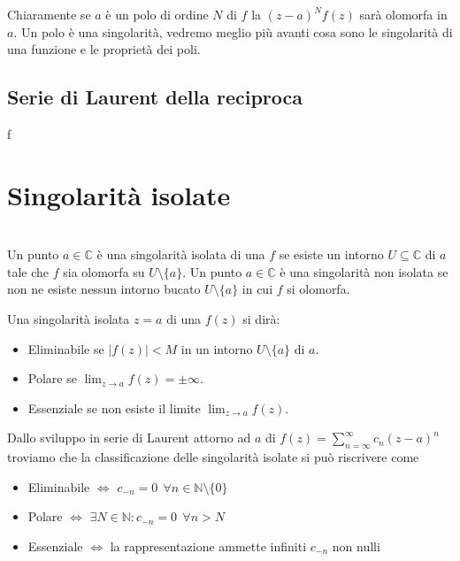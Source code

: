 \documentclass[11pt,a4paper,twoside]{book}
\newenvironment{definizione}[1][\empty]{\begin{Definizione}{
\ifx\empty#1\relax\else\mdseries\itshape#1\\\fi
}{}}{\end{Definizione}}
\theoremstyle{esss}
\theoremstyle{dotless}
\numberwithin{equation}{section} %
\begin{document}
Chiaramente se $a$ è un polo di ordine $N$ di $f$ la $(z-a)^N f(z)$ sarà olomorfa in $a$.
Un polo è una singolarità, vedremo meglio più avanti cosa sono le singolarità di una funzione e le proprietà dei poli.

\subsection{Serie di Laurent della reciproca}
f

\section{Singolarità isolate}

\begin{definizione}Un punto $a\in\mathbb{C}$ è una singolarità isolata di una $f$ se esiste un intorno $U\subseteq\mathbb{C}$ di $a$ tale che $f$ sia olomorfa su $U\setminus\{a\}$. Un punto $a\in\mathbb{C}$ è una singolarità non isolata se non ne esiste nessun intorno bucato $U\setminus\{a\}$ in cui $f$ si olomorfa.
\end{definizione}

Una singolarità isolata $z=a$ di una $f(z)$ si dirà:\begin{itemize}[label=$\cdot$]
\item Eliminabile se $|f(z)|<M$ in un intorno $U\setminus\{a\}$ di $a$. 
\item Polare se $\lim_{z\rightarrow a}f(z)=\pm\infty$.
\item Essenziale se non esiste il limite $\lim_{z\rightarrow a}f(z)$.
\end{itemize}

Dallo sviluppo in serie di Laurent attorno ad $a$ di $f(z)=\sum_{n=\infty}^\infty c_n (z-a)^n$ troviamo che la classificazione delle singolarità isolate si può riscrivere come
\begin{itemize}[label=$\cdot$]
\item Eliminabile $\iff$ $c_{-n}=0 \>\> \forall n\in\mathbb{N}\setminus\{0\}$
\item Polare $\iff$ $\exists N\in\mathbb{N}: c_{-n}=0 \>\> \forall n >N$
\item Essenziale $\iff$ la rappresentazione ammette infiniti $c_{-n}$ non nulli
\end{itemize}
\end{document}
